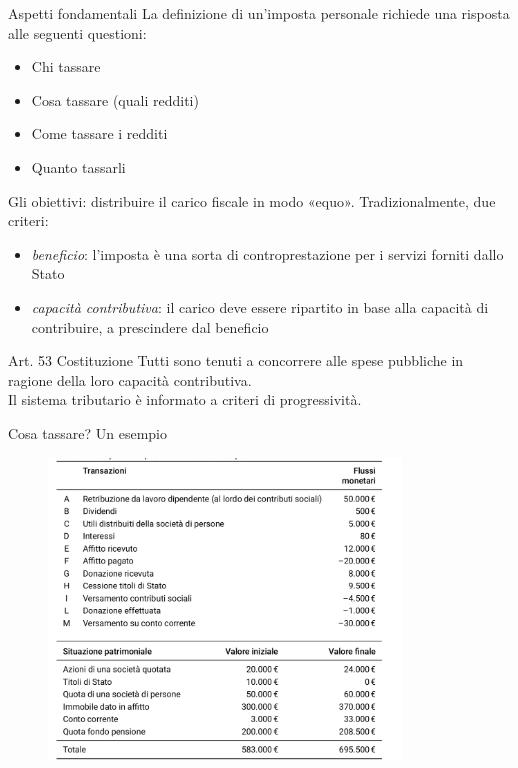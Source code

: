 \documentclass[11pt]{beamer}
\newcommand\€{\,\text{€}}
\begin{document}
\begin{frame}{Aspetti fondamentali}
La definizione di un'imposta personale richiede una risposta alle seguenti questioni:
\begin{itemize}
\item Chi tassare
\item Cosa tassare (quali redditi)
\item Come tassare i redditi
\item Quanto tassarli
\end{itemize}
Gli obiettivi: distribuire il carico fiscale in modo «equo».
Tradizionalmente, due criteri:
\begin{itemize}
\item \emph{beneficio}: l'imposta è una sorta di controprestazione per i servizi forniti dallo Stato
\item \emph{capacità contributiva}: il carico deve essere ripartito in base alla capacità di contribuire, a prescindere dal beneficio
\end{itemize}
\begin{block}{Art. 53 Costituzione}
Tutti  sono  tenuti  a  concorrere  alle spese pubbliche in ragione della loro capacità contributiva.\\[0pt]
Il sistema tributario è informato a criteri di progressività.
\end{block}
\end{frame}

\begin{frame}{Cosa tassare? Un esempio}
\begin{figure}
\centering
\includegraphics[height=8cm]{./figure/esempio-reddito-patrimonio.png}
\end{figure}
\end{frame}
\end{document}
